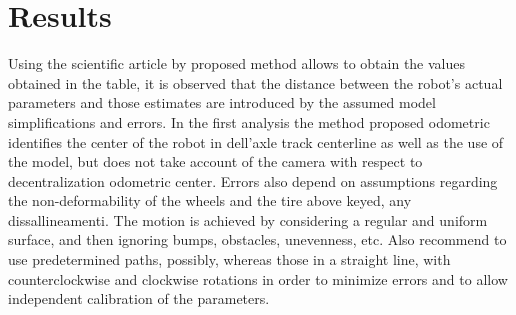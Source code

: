 \section{Results}
Using the scientific article by proposed method allows to obtain the values obtained in the table, it is observed that the distance between the robot's actual parameters and those estimates are introduced by the assumed model simplifications and errors.
In the first analysis the method proposed odometric identifies the center of the robot in dell'axle track centerline as well as the use of the model, but does not take account of the camera with respect to decentralization odometric center.
Errors also depend on assumptions regarding the non-deformability of the wheels and the tire above keyed, any dissallineamenti. The motion is achieved by considering a regular and uniform surface, and then ignoring bumps, obstacles, unevenness, etc.
Also recommend to use predetermined paths, possibly, whereas those in a straight line, with counterclockwise and clockwise rotations in order to minimize errors and to allow independent calibration of the parameters.
